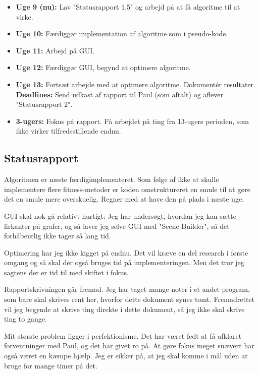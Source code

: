 \begin{itemize}
    \item \textbf{Uge 9 (nu):} Lav "Statusrapport 1.5" og arbejd på at få
    algoritme til at virke. 
    \item \textbf{Uge 10:} Færdiggør implementation af algoritme som i
    pseudo-kode. 
    \item \textbf{Uge 11:} Arbejd på GUI. 
    \item \textbf{Uge 12:} Færdiggør GUI, begynd at optimere algoritme. 
    \item \textbf{Uge 13:} Fortsæt arbejde med at optimere algoritme. Dokumentér
    resultater. \textbf{Deadlines:} Send udkast af rapport til Paul (som aftalt) 
    og aflever "Statusrapport 2". 
    \item \textbf{3-ugers:} Fokus på rapport. Få arbejdet på ting fra 13-ugers
    perioden, som ikke virker tilfredsstillende endnu. 
\end{itemize}

\subsection{Statusrapport}

Algoritmen er næste færdigimplementeret. Som følge af ikke at skulle
implementere flere fitness-metoder er koden omstruktureret en smule til at gøre
det en smule mere overskuelig. Regner med at have den på plads i næste uge. 

GUI skal nok gå relativt hurtigt: Jeg har undersøgt, hvordan jeg kan sætte
firkanter på grafer, og så laver jeg selve GUI med "Scene Builder", så det
forhåbentlig ikke tager så lang tid. 

Optimering har jeg ikke kigget på endnu. Det vil kræve en del research i første
omgang og så skal der også bruges tid på implementeringen. Men det tror jeg
sagtens der er tid til med skiftet i fokus. 

Rapportskrivningen går fremad. Jeg har taget mange noter i et andet program, som
bare skal skrives rent her, hvorfor dette dokument synes tomt. Fremadrettet vil
jeg begynde at skrive ting direkte i dette dokument, så jeg ikke skal skrive
ting to gange. 

Mit største problem ligger i perfektionisme. Det har været fedt at få afklaret
forventninger med Paul, og det har givet ro på. At gøre fokus meget snævert har
også været en kæmpe hjælp. Jeg er sikker på, at jeg skal komme i mål uden at
bruge for mange timer på det. 

\newpage 